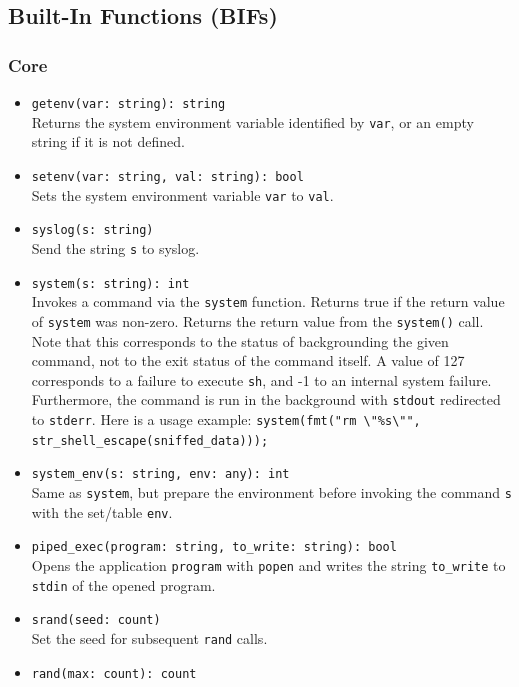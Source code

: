 \documentclass[10pt,landscape]{article}
\begin{document}
\begin{multicols*}{2}
\subsection*{Built-In Functions (BIFs)}
\linespread{0.9}

\subsubsection*{Core}

\begin{itemize}
  \item \verb|getenv(var: string): string|\\
    Returns the system environment variable identified by \verb|var|, or an
    empty string if it is not defined.
  \item \verb|setenv(var: string, val: string): bool|\\
    Sets the system environment variable \verb|var| to \verb|val|.
  \item \verb|syslog(s: string)|\\
    Send the string \verb|s| to syslog.
  \item \verb|system(s: string): int|\\
    Invokes a command via the \texttt{system} function.
    Returns true if the return value of \texttt{system} was non-zero.
    Returns the return value from the \texttt{system()} call. Note that this
    corresponds to the status of backgrounding the given command, not to the
    exit status of the command itself. A value of 127 corresponds to a failure
    to execute \verb|sh|, and -1 to an internal system failure. Furthermore,
    the command is run in the background with \verb|stdout| redirected to
    \verb|stderr|. Here is a usage example:
    \verb|system(fmt("rm \"%s\"", str_shell_escape(sniffed_data)));|
  \item \verb|system_env(s: string, env: any): int|\\
    Same as \verb|system|, but prepare the environment before invoking the
    command \verb|s| with the set/table \verb|env|.
  \item \verb|piped_exec(program: string, to_write: string): bool|\\
    Opens the application \verb|program| with \verb|popen| and writes the
    string \verb|to_write| to \texttt{stdin} of the opened program. 
  \item \verb|srand(seed: count)|\\
    Set the seed for subsequent \verb|rand| calls.
  \item \verb|rand(max: count): count|\\

\end{itemize}
\end{multicols*}
\end{document}
